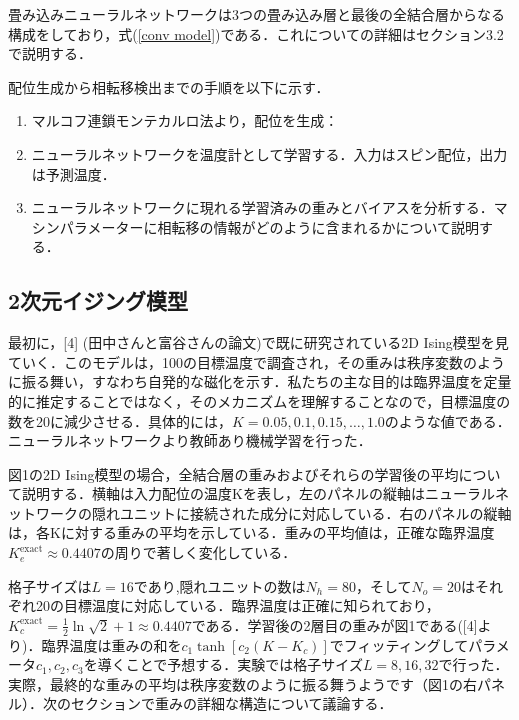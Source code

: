 \documentclass[a4paper,11pt]{jsreport}
\begin{document}
畳み込みニューラルネットワークは3つの畳み込み層と最後の全結合層からなる構成をしており，式(\ref{conv model})である．これについての詳細はセクション3.2で説明する．\par
配位生成から相転移検出までの手順を以下に示す．
\begin{enumerate}
  \item マルコフ連鎖モンテカルロ法より，配位を生成：
  \item ニューラルネットワークを温度計として学習する．入力はスピン配位，出力は予測温度．
  \item ニューラルネットワークに現れる学習済みの重みとバイアスを分析する．マシンパラメーターに相転移の情報がどのように含まれるかについて説明する．
\end{enumerate}

\subsection{2次元イジング模型}
最初に，[4] (田中さんと富谷さんの論文)で既に研究されている2D Ising模型を見ていく．このモデルは，100の目標温度で調査され，その重みは秩序変数のように振る舞い，すなわち自発的な磁化を示す．私たちの主な目的は臨界温度を定量的に推定することではなく，そのメカニズムを理解することなので，目標温度の数を20に減少させる．具体的には，$K = 0.05, 0.1, 0.15, \dots, 1.0$のような値である．ニューラルネットワークより教師あり機械学習を行った．

図1の2D Ising模型の場合，全結合層の重みおよびそれらの学習後の平均について説明する．横軸は入力配位の温度Kを表し，左のパネルの縦軸はニューラルネットワークの隠れユニットに接続された成分に対応している．右のパネルの縦軸は，各Kに対する重みの平均を示している．重みの平均値は，正確な臨界温度$K_e^{\text{exact}} \approx 0.4407$の周りで著しく変化している．


格子サイズは$L = 16$であり,隠れユニットの数は$N_h = 80$，そして$N_o = 20$はそれぞれ20の目標温度に対応している．臨界温度は正確に知られており，$K_c^{\text{exact}} = \frac{1}{2}\ln{\sqrt{2}+1} \approx 0.4407$である．学習後の2層目の重みが図1である([4]より)．臨界温度は重みの和を$c_1 \tanh{[c_2(K-K_c)]}$でフィッティングしてパラメータ$c_1,c_2,c_3$を導くことで予想する．実験では格子サイズ$L=8,16,32$で行った．実際，最終的な重みの平均は秩序変数のように振る舞うようです（図1の右パネル）．次のセクションで重みの詳細な構造について議論する．
\end{document}
